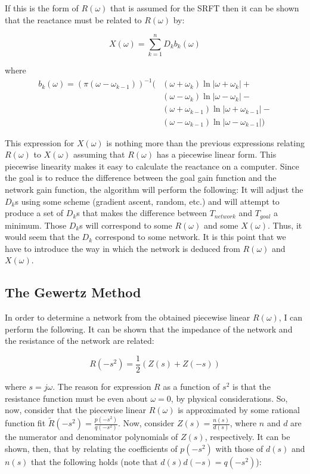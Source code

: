 If this is the form of $R(\omega)$ that is assumed for the SRFT then it can be
shown that the reactance must be related to $R(\omega)$ by:

\[
X(\omega) = \sum^{n}_{k=1} D_k b_k(\omega)
\]

where
\begin{align*}
    b_k(\omega) = (\pi \left( \omega - \omega_{k-1} \right))^{-1} \big(
&\left( \omega + \omega_k \right) \ln \left| \omega + \omega_k \right| +
\\
&\left( \omega - \omega_k \right) \ln \left| \omega - \omega_k \right| - \\
&\left(\omega + \omega_{k-1} \right) \ln \left| \omega + \omega_{k-1} \right| - 
\\
&\left( \omega - \omega_{k-1} \right) \ln \left| \omega - \omega_{k-1} \right| 
\big)
\end{align*}

This expression for $X(\omega)$ is nothing more than the previous expressions
relating $R(\omega)$ to $X(\omega)$ assuming that $R(\omega)$ has a piecewise
linear form. This piecewise linearity makes it easy to calculate the reactance
on a computer. Since the goal is to reduce the difference between the goal gain
function and the network gain function, the algorithm will perform the
following: It will adjust the $D_k$s using some scheme (gradient ascent, random,
etc.) and will attempt to produce a set of $D_k$s that makes the difference
between $T_{network}$ and $T_{goal}$ a minimum. Those $D_k$s will correspond to
some $R(\omega)$ and some $X(\omega)$. Thus, it would seem that the $D_k$
correspond to some network. It is this point that we have to introduce the way
in which the network is deduced from $R(\omega)$ and $X(\omega)$.

\subsection*{The Gewertz Method}

In order to determine a network from the obtained piecewise linear $R(\omega)$,
I can perform the following. It can be shown that the impedance of the network
and the resistance of the network are related:

\[ 
R(-s^2) = \frac{1}{2} \left( Z(s) + Z(-s) \right) 
\]

where $s = j\omega$. The reason for expression $R$ as a function of $s^2$ is
that the resistance function must be even about $\omega = 0$, by physical
considerations. So, now, consider that the piecewise linear $R(\omega)$ is
approximated by some rational function fit $\tilde{R}(-s^2) =
\frac{p(-s^2)}{q(-s^2)}$.  Now, consider $Z(s) = \frac{n(s)}{d(s)}$, where $n$
and $d$ are the numerator and denominator polynomials of $Z(s)$, respectively.
It can be shown, then, that by relating the coefficients of $p(-s^2)$ with those
of $d(s)$ and $n(s)$ that the following holds (note that $d(s)d(-s) = q(-s^2)$):

